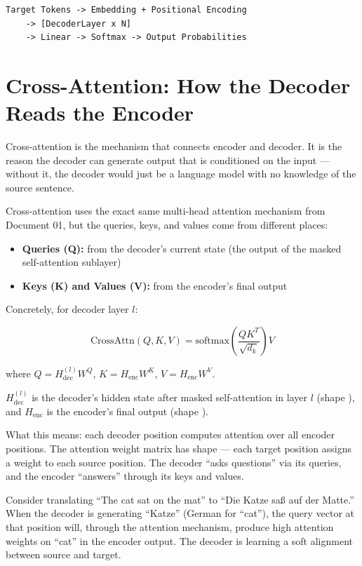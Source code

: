\begin{verbatim}
Target Tokens -> Embedding + Positional Encoding
    -> [DecoderLayer x N]
    -> Linear -> Softmax -> Output Probabilities
\end{verbatim}

\section{Cross-Attention: How the Decoder Reads the Encoder}

Cross-attention is the mechanism that connects encoder and decoder. It is the reason the decoder can generate output that is conditioned on the input --- without it, the decoder would just be a language model with no knowledge of the source sentence.

Cross-attention uses the exact same multi-head attention mechanism from Document 01, but the queries, keys, and values come from different places:

\begin{itemize}
  \item \textbf{Queries (Q):} from the decoder's current state (the output of the masked self-attention sublayer)
  \item \textbf{Keys (K) and Values (V):} from the encoder's final output
\end{itemize}

Concretely, for decoder layer $l$:

\[\text{CrossAttn}(Q, K, V) = \text{softmax}\left(\frac{Q K^T}{\sqrt{d_k}}\right) V\]

where $Q = H_{\text{dec}}^{(l)} W^Q$, $K = H_{\text{enc}} W^K$, $V = H_{\text{enc}} W^V$.

$H_{\text{dec}}^{(l)}$ is the decoder's hidden state after masked self-attention in layer $l$ (shape ), and $H_{\text{enc}}$ is the encoder's final output (shape ).

What this means: each decoder position computes attention over all encoder positions. The attention weight matrix has shape  --- each target position assigns a weight to each source position. The decoder ``asks questions'' via its queries, and the encoder ``answers'' through its keys and values.

Consider translating ``The cat sat on the mat'' to ``Die Katze sa\ss{} auf der Matte.'' When the decoder is generating ``Katze'' (German for ``cat''), the query vector at that position will, through the attention mechanism, produce high attention weights on ``cat'' in the encoder output. The decoder is learning a soft alignment between source and target.

